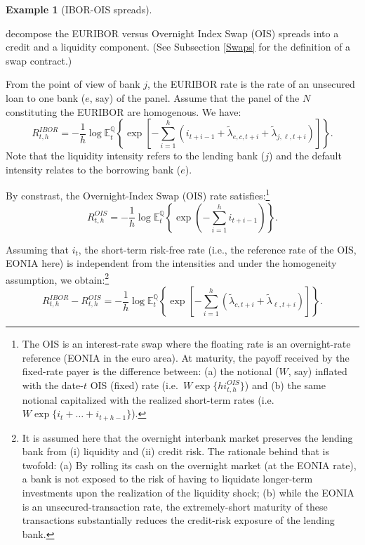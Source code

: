 \documentclass[
  12pt,
]{book}
\theoremstyle{definition}
\theoremstyle{definition}
\newtheorem{example}{Example}[chapter]
\theoremstyle{definition}
\theoremstyle{definition}
\theoremstyle{remark}
\begin{document}
\begin{example}[IBOR-OIS spreads]
\protect\hypertarget{exm:IBOROIS}{}\label{exm:IBOROIS}

\citet{DUBECQ201629} decompose the EURIBOR versus Overnight Index Swap (OIS) spreads into a credit and a liquidity component. (See Subsection \ref{Swaps} for the definition of a swap contract.)

From the point of view of bank \(j\), the EURIBOR rate is the rate of an unsecured loan to one bank (\(e\), say) of the panel. Assume that the panel of the \(N\) constituting the EURIBOR are homogenous. We have:
\begin{equation}
R^{IBOR}_{t,h} = - \frac{1}{h} \log \mathbb{E}^{\mathbb{Q}}_t \left\{ \exp \left[ - \sum_{i=1}^{h} \left( i_{t+i-1} + \widetilde{\lambda}_{e,c, t+i} + \widetilde{\lambda}_{j,\ell, t+i} \right) \right] \right\}.\label{eq:EURIBOR}
\end{equation}
Note that the liquidity intensity refers to the lending bank (\(j\)) and the default intensity relates to the borrowing bank (\(e\)).

By constrast, the Overnight-Index Swap (OIS) rate satisfies:\footnote{The OIS is an interest-rate swap where the floating rate is an overnight-rate reference (EONIA in the euro area). At maturity, the payoff received by the fixed-rate payer is the difference between: (a) the notional (\(W\), say) inflated with the date-\(t\) OIS (fixed) rate (i.e.~\(W\exp\{h i_{t,h}^{OIS}\}\)) and (b) the same notional capitalized with the realized short-term rates (i.e.~\(W\exp\{i_{t} + \ldots + i_{t+h-1}\}\)).}
\begin{equation}
R^{OIS}_{t,h} = - \frac{1}{h} \log \mathbb{E}^{\mathbb{Q}}_t \left\{ \exp \left( - \sum_{i=1}^{h}  i_{t+i-1} \right) \right\}.\label{eq:OIS}
\end{equation}

Assuming that \(i_t\), the short-term risk-free rate (i.e., the reference rate of the OIS, EONIA here) is independent from the intensities and under the homogeneity assumption, we obtain:\footnote{It is assumed here that the overnight interbank market preserves the lending bank from (i) liquidity and (ii) credit risk. The rationale behind that is twofold: (a) By rolling its cash on the overnight market (at the EONIA rate), a bank is not exposed to the risk of having to liquidate longer-term investments upon the realization of the liquidity shock; (b) while the EONIA is an unsecured-transaction rate, the extremely-short maturity of these transactions substantially reduces the credit-risk exposure of the lending bank.}
\[
R^{IBOR}_{t,h} - R^{OIS}_{t,h} = - \frac{1}{h} \log \mathbb{E}^{\mathbb{Q}}_t \left\{ \exp \left[ - \sum_{i=1}^{h} \left( \widetilde{\lambda}_{c, t+i} + \widetilde{\lambda}_{\ell, t+i} \right) \right] \right\}.
\]


\end{example}
\end{document}
